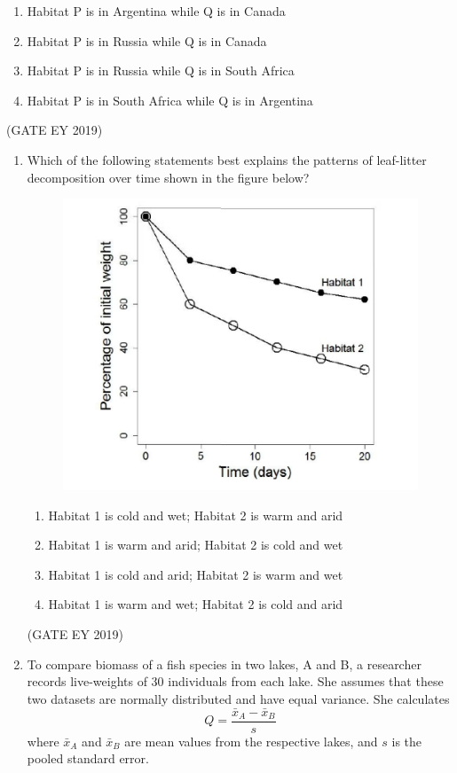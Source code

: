 \documentclass[journal,12pt,onecolumn]{IEEEtran}
\theoremstyle{remark}
\begin{document}
\begin{enumerate}[leftmargin=*]
\begin{enumerate}[nosep]

\item Habitat P is in Argentina while Q is in Canada
\item Habitat P is in Russia while Q is in Canada
\item Habitat P is in Russia while Q is in South Africa
\item Habitat P is in South Africa while Q is in Argentina
\end{enumerate}


\end{enumerate}
\hfill{(GATE EY 2019)}


\begin{enumerate}[resume]
\item Which of the following statements best explains the patterns of leaf-litter decomposition over time shown in the figure below?

\begin{figure}[H]
    \centering
    \includegraphics[]{figs/15.png}
    \caption{}
    \label{fig:2}
\end{figure}

\begin{enumerate}[nosep]
\item Habitat 1 is cold and wet; Habitat 2 is warm and arid
\item Habitat 1 is warm and arid; Habitat 2 is cold and wet
\item Habitat 1 is cold and arid; Habitat 2 is warm and wet
\item Habitat 1 is warm and wet; Habitat 2 is cold and arid
\end{enumerate}
\hfill{(GATE EY 2019)}
\item To compare biomass of a fish species in two lakes, A and B, a researcher records live-weights of 30 individuals from each lake. She assumes that these two datasets are normally distributed and have equal variance. She calculates
\[
Q=\frac{\bar{x}_A-\bar{x}_B}{s}
\]
where $\bar{x}_A$ and $\bar{x}_B$ are mean values from the respective lakes, and $s$ is the pooled standard error.  


\end{enumerate}
\end{document}
